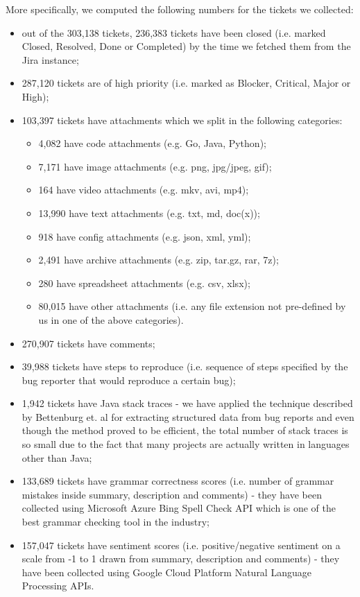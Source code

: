 \documentclass{mpaper}
\begin{document}
More specifically, we computed the following numbers for the tickets we collected:
\begin{itemize}
  \item out of the 303,138 tickets, 236,383 tickets have been closed (i.e. marked Closed, Resolved, Done or Completed) by the time we 
  fetched them from the Jira instance;
  \item 287,120 tickets are of high priority (i.e. marked as Blocker, Critical, Major or High);
  \item 103,397 tickets have attachments which we split in the following categories:
    \begin{itemize}
      \item 4,082 have code attachments (e.g. Go, Java, Python);
      \item 7,171 have image attachments (e.g. png, jpg/jpeg, gif);
      \item 164 have video attachments (e.g. mkv, avi, mp4);
      \item 13,990 have text attachments (e.g. txt, md, doc(x));
      \item 918 have config attachments (e.g. json, xml, yml);
      \item 2,491 have archive attachments (e.g. zip, tar.gz, rar, 7z);
      \item 280 have spreadsheet attachments (e.g. csv, xlsx);
      \item 80,015 have other attachments (i.e. any file extension not pre-defined by us in one of the above categories).
    \end{itemize}
  \item 270,907 tickets have comments;
  \item 39,988 tickets have steps to reproduce (i.e. sequence of steps specified by the bug reporter that would reproduce a certain bug); 
  \item 1,942 tickets have Java stack traces - we have applied the technique described by Bettenburg et. al 
  \cite{bettenburg2008extracting} for extracting structured data from bug reports and even though the method proved to be efficient, 
  the total number of stack traces is so small due to the fact that many projects are actually written in languages other than Java;
  \item 133,689 tickets have grammar correctness scores (i.e. number of grammar mistakes inside summary, description and comments) - 
  they have been collected using Microsoft Azure Bing Spell Check API which is one of the best grammar checking tool in the industry; 
  \item 157,047 tickets have sentiment scores (i.e. positive/negative sentiment on a scale from -1 to 1 drawn from summary, description
  and comments) - they have been collected using Google Cloud Platform Natural Language Processing APIs.
\end{itemize}
\end{document}
